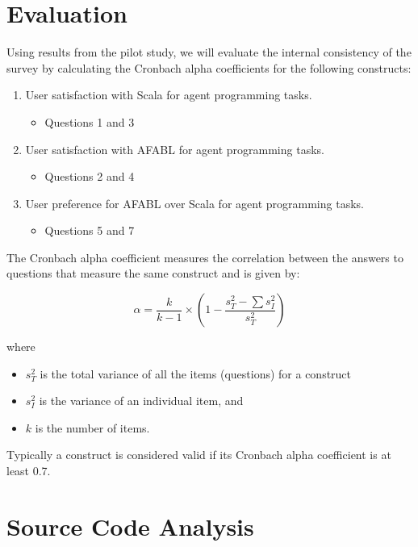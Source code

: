 \section{Evaluation}

Using results from the pilot study, we will evaluate the internal consistency of the survey by calculating the Cronbach alpha coefficients for the following constructs:

\begin{enumerate}

\item User satisfaction with Scala for agent programming tasks.
\begin{itemize}
\item Questions 1 and 3
\end{itemize}

\item User satisfaction with AFABL for agent programming tasks.
\begin{itemize}
\item  Questions 2 and 4
\end{itemize}

\item User preference for AFABL over Scala for agent programming tasks.
\begin{itemize}
\item Questions 5 and 7
\end{itemize}

\end{enumerate}

The Cronbach alpha coefficient measures the correlation between the answers to questions that measure the same construct and is given by:

\[
\alpha = \frac{k}{k - 1} \times (1 - \frac{s_{T}^{2} - \sum s_{I}^{2}}{s_{T}^{2}})
\]

where
\begin{itemize}
\item $s_T^2$ is the total variance of all the items (questions) for a construct
\item $s_I^2$ is the variance of an individual item, and
\item $k$ is the number of items.
\end{itemize}

Typically a construct is considered valid if its Cronbach alpha coefficient is at least 0.7.



\section{Source Code Analysis}

